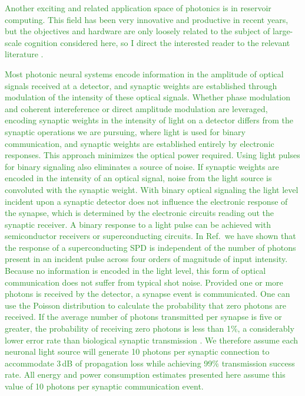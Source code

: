 \documentclass{article}
\newcommand{\onlinecite}[1]{\hspace{-1 ex} \nocite{#1}\citenum{#1}}
\begin{document}
\begin{multicols}{2}
\textcolor{ForestGreen}{Another exciting and related application space of photonics is in reservoir computing. This field has been very innovative and productive in recent years, but the objectives and hardware are only loosely related to the subject of large-scale cognition considered here, so I direct the interested reader to the relevant literature \cite{funa1993,vada2011,orso2015,vabr2017,brpe2018}.} 

\textcolor{ForestGreen}{Most photonic neural systems encode information in the amplitude of optical signals received at a detector, and synaptic weights are established through modulation of the intensity of these optical signals. Whether phase modulation and coherent intereference or direct amplitude modulation are leveraged, encoding synaptic weights in the intensity of light on a detector differs from the synaptic operations we are pursuing, where light is used for binary communication, and synaptic weights are established entirely by electronic responses. This approach minimizes the optical power required. Using light pulses for binary signaling also eliminates a source of noise. If synaptic weights are encoded in the intensity of an optical signal, noise from the light source is convoluted with the synaptic weight. With binary optical signaling the light level incident upon a synaptic detector does not influence the electronic response of the synapse, which is determined by the electronic circuits reading out the synaptic receiver. A binary response to a light pulse can be achieved with semiconductor receivers or superconducting circuits. In Ref.\,\onlinecite{buta2020_2} we have shown that the response of a superconducting SPD is independent of the number of photons present in an incident pulse across four orders of magnitude of input intensity. Because no information is encoded in the light level, this form of optical communication does not suffer from typical shot noise. Provided one or more photons is received by the detector, a synapse event is communicated. One can use the Poisson distribution to calculate the probability that zero photons are received. If the average number of photons transmitted per synapse is five or greater, the probability of receiving zero photons is less than 1\%, a considerably lower error rate than biological synaptic transmission \cite{li1997}. We therefore assume each neuronal light source will generate 10 photons per synaptic connection to accommodate 3\,dB of propagation loss while achieving 99\% transmission success rate. All energy and power consumption estimates presented here assume this value of 10 photons per synaptic communication event.}


\end{multicols}
\end{document}
